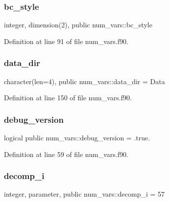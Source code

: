 \subsubsection{\texorpdfstring{bc\+\_\+style}{bc\_style}}
{\footnotesize\ttfamily integer, dimension(2), public num\+\_\+vars\+::bc\+\_\+style}



Definition at line 91 of file num\+\_\+vars.\+f90.

\mbox{\label{namespacenum__vars_af48173a7062997585f7a7ca9363290b3}} 
\subsubsection{\texorpdfstring{data\+\_\+dir}{data\_dir}}
{\footnotesize\ttfamily character(len=4), public num\+\_\+vars\+::data\+\_\+dir = \textquotesingle{}Data\textquotesingle{}}



Definition at line 150 of file num\+\_\+vars.\+f90.

\mbox{\label{namespacenum__vars_a60589d0e73cbffd69d115c1f709745a2}} 
\subsubsection{\texorpdfstring{debug\+\_\+version}{debug\_version}}
{\footnotesize\ttfamily logical public num\+\_\+vars\+::debug\+\_\+version = .true.}



Definition at line 59 of file num\+\_\+vars.\+f90.

\mbox{\label{namespacenum__vars_a886394fc855acaa9a5e4ab5b3ce8c9d9}} 
\subsubsection{\texorpdfstring{decomp\+\_\+i}{decomp\_i}}
{\footnotesize\ttfamily integer, parameter, public num\+\_\+vars\+::decomp\+\_\+i = 57}



